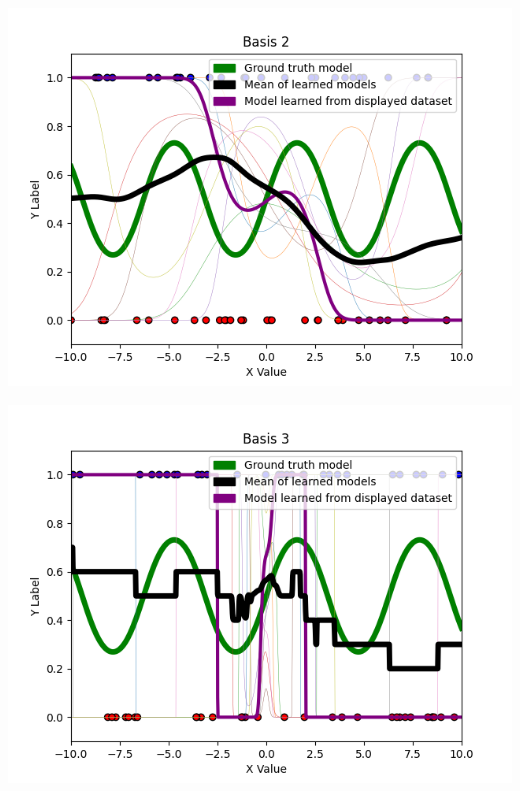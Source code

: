 \documentclass[submit]{harvardml}
\begin{document}
\begin{enumerate}
\includegraphics[width=.7\textwidth]{Basis2-60pts.png}

\includegraphics[width=.7\textwidth]{Basis3-60pts.png}
\end{enumerate}
\end{document}
